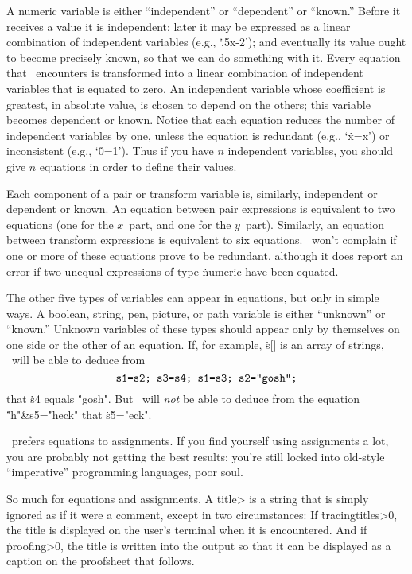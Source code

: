 A numeric variable is either ``independent'' or ``dependent'' or ``known.''
Before it receives a value it is independent; later it may be expressed as
a linear combination of independent variables (e.g., `\.{.5x-2}'); and
eventually its value ought to become precisely known, so that we can do
something with it. Every equation that \MF\ encounters is transformed
into a linear combination of independent variables that is equated to zero.
An independent variable whose coefficient is greatest, in absolute value,
is chosen to depend on the others; this variable becomes dependent
or known. Notice that each equation reduces the number of independent
variables by one, unless the equation is redundant (e.g., `\.{x=x}')
or inconsistent (e.g., `\.{0=1}'). Thus if you have $n$ independent variables,
you should give $n$ equations in order to define their values.

Each component of a pair or transform variable is, similarly,
independent or dependent or known. An equation between pair expressions
is equivalent to two equations (one for the $x$~part, and one for the
$y$~part). Similarly, an equation between transform expressions is
equivalent to six equations. \MF\ won't complain if one or more of these
equations prove to be redundant, although it does report an error if
two unequal expressions of type \.{numeric} have been equated.

The other five types of variables can appear in equations, but only
in simple ways. A boolean, string, pen, picture, or path variable is
either ``unknown'' or ``known.'' Unknown variables of these types should
appear only by themselves on one side or the other of an equation. If, for
example, \.{s[]} is an array of strings, \MF\ will be able to deduce from
$$\hbox{\tt s1=s2; s3=s4; s1=s3; s2="gosh";}$$
that \.{s4} equals \.{"gosh"}. But \MF\ will {\it not\/} be able to
deduce from the equation \.{"h"\&s5="heck"} that \.{s5="eck"}.

\MF\ prefers equations to assignments. If you find yourself using
assignments a lot, you are probably not getting the best results;
you're still locked into old-style ``imperative'' programming languages,
poor soul.

So much for equations and assignments. A \<title> is a string that
is simply ignored as if it were a comment, except in two circumstances:
If \.{tracingtitles>0}, the title is displayed on the user's terminal
when it is encountered. And if \.{proofing>0}, the title is written
into the output so that it can be displayed as a caption on
the proofsheet that follows.


